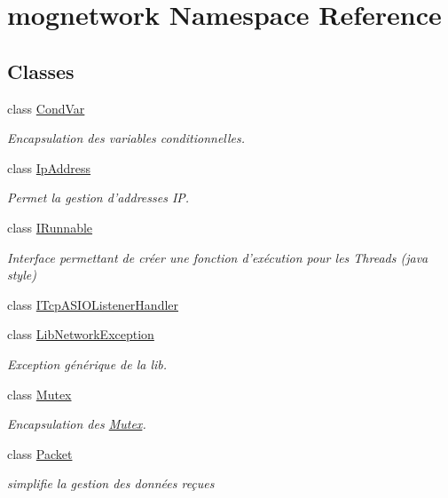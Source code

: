 \hypertarget{namespacemognetwork}{\section{mognetwork Namespace Reference}
\label{namespacemognetwork}
}
\subsection*{Classes}
\begin{DoxyCompactItemize}
\item 
class \hyperlink{classmognetwork_1_1_cond_var}{Cond\-Var}
\begin{DoxyCompactList}\small\item\em Encapsulation des variables conditionnelles. \end{DoxyCompactList}\item 
class \hyperlink{classmognetwork_1_1_ip_address}{Ip\-Address}
\begin{DoxyCompactList}\small\item\em Permet la gestion d'addresses I\-P. \end{DoxyCompactList}\item 
class \hyperlink{classmognetwork_1_1_i_runnable}{I\-Runnable}
\begin{DoxyCompactList}\small\item\em Interface permettant de créer une fonction d'exécution pour les Threads (java style) \end{DoxyCompactList}\item 
class \hyperlink{classmognetwork_1_1_i_tcp_a_s_i_o_listener_handler}{I\-Tcp\-A\-S\-I\-O\-Listener\-Handler}
\item 
class \hyperlink{classmognetwork_1_1_lib_network_exception}{Lib\-Network\-Exception}
\begin{DoxyCompactList}\small\item\em Exception générique de la lib. \end{DoxyCompactList}\item 
class \hyperlink{classmognetwork_1_1_mutex}{Mutex}
\begin{DoxyCompactList}\small\item\em Encapsulation des \hyperlink{classmognetwork_1_1_mutex}{Mutex}. \end{DoxyCompactList}\item 
class \hyperlink{classmognetwork_1_1_packet}{Packet}
\begin{DoxyCompactList}\small\item\em simplifie la gestion des données reçues \end{DoxyCompactList}\item 

\end{DoxyCompactItemize}
